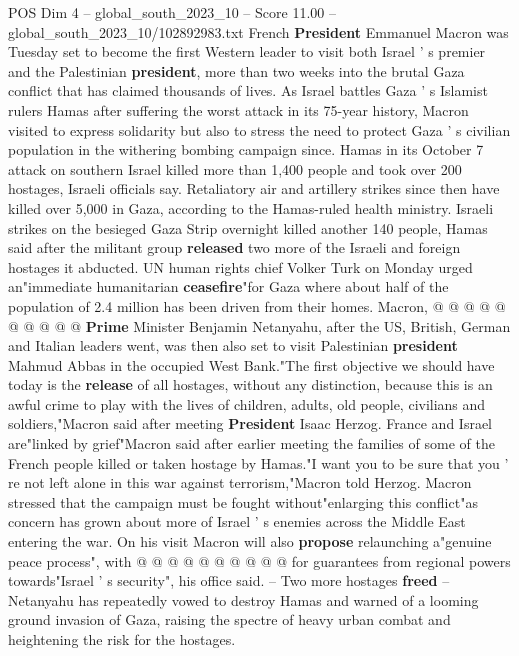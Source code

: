 \begin{textsample}{POS Dim 4 – global\_south\_2023\_10 – Score 11.00 – global\_south\_2023\_10/102892983.txt}  \label{ex:f4_pos_430}
French \textbf{President} Emmanuel Macron was Tuesday set to become the first Western leader to visit both Israel ' s premier and the Palestinian \textbf{president}, more than two weeks into the brutal Gaza conflict that has claimed thousands of lives.
As Israel battles Gaza ' s Islamist rulers Hamas after suffering the worst attack in its 75-year history, Macron visited to express solidarity but also to stress the need to protect Gaza ' s civilian population in the withering bombing campaign since.
Hamas in its October 7 attack on southern Israel killed more than 1,400 people and took over 200 hostages, Israeli officials say.
Retaliatory air and artillery strikes since then have killed over 5,000 in Gaza, according to the Hamas-ruled health ministry.
Israeli strikes on the besieged Gaza Strip overnight killed another 140 people, Hamas said after the militant group \textbf{released} two more of the Israeli and foreign hostages it abducted.
UN human rights chief Volker Turk on Monday urged an"immediate humanitarian \textbf{ceasefire}"for Gaza where about half of the population of 2.4 million has been driven from their homes.
Macron, @ @ @ @ @ @ @ @ @ @ \textbf{Prime} Minister Benjamin Netanyahu, after the US, British, German and Italian leaders went, was then also set to visit Palestinian \textbf{president} Mahmud Abbas in the occupied West Bank."The first objective we should have today is the \textbf{release} of all hostages, without any distinction, because this is an awful crime to play with the lives of children, adults, old people, civilians and soldiers,"Macron said after meeting \textbf{President} Isaac Herzog.
France and Israel are"linked by grief"Macron said after earlier meeting the families of some of the French people killed or taken hostage by Hamas."I want you to be sure that you ' re not left alone in this war against terrorism,"Macron told Herzog.
Macron stressed that the campaign must be fought without"enlarging this conflict"as concern has grown about more of Israel ' s enemies across the Middle East entering the war.
On his visit Macron will also \textbf{propose} relaunching a"genuine peace process", with @ @ @ @ @ @ @ @ @ @ for guarantees from regional powers towards"Israel ' s security", his office said. -- Two more hostages \textbf{freed} -- Netanyahu has repeatedly vowed to destroy Hamas and warned of a looming ground invasion of Gaza, raising the spectre of heavy urban combat and heightening the risk for the hostages.

\end{textsample}
